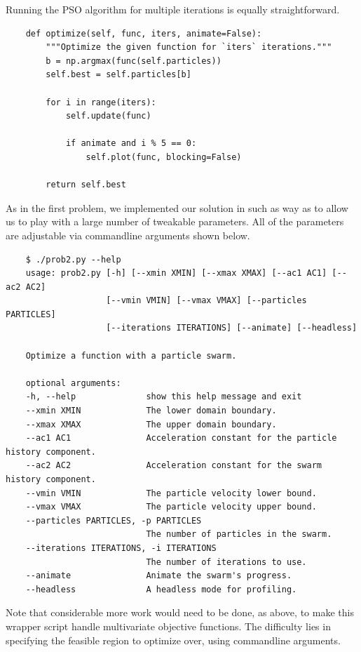 \documentclass[12pt]{article}
\begin{document}
Running the PSO algorithm for multiple iterations is equally straightforward.

\begin{verbatim}
    def optimize(self, func, iters, animate=False):
        """Optimize the given function for `iters` iterations."""
        b = np.argmax(func(self.particles))
        self.best = self.particles[b]

        for i in range(iters):
            self.update(func)

            if animate and i % 5 == 0:
                self.plot(func, blocking=False)

        return self.best
\end{verbatim}

As in the first problem, we implemented our solution in such as way as to allow us to play with a large number of tweakable parameters.
All of the parameters are adjustable via commandline arguments shown below.

\begin{verbatim}
    $ ./prob2.py --help
    usage: prob2.py [-h] [--xmin XMIN] [--xmax XMAX] [--ac1 AC1] [--ac2 AC2]
                    [--vmin VMIN] [--vmax VMAX] [--particles PARTICLES]
                    [--iterations ITERATIONS] [--animate] [--headless]

    Optimize a function with a particle swarm.

    optional arguments:
    -h, --help              show this help message and exit
    --xmin XMIN             The lower domain boundary.
    --xmax XMAX             The upper domain boundary.
    --ac1 AC1               Acceleration constant for the particle history component.
    --ac2 AC2               Acceleration constant for the swarm history component.
    --vmin VMIN             The particle velocity lower bound.
    --vmax VMAX             The particle velocity upper bound.
    --particles PARTICLES, -p PARTICLES
                            The number of particles in the swarm.
    --iterations ITERATIONS, -i ITERATIONS
                            The number of iterations to use.
    --animate               Animate the swarm's progress.
    --headless              A headless mode for profiling.
\end{verbatim}

Note that considerable more work would need to be done, as above, to make this wrapper script handle multivariate objective functions.
The difficulty lies in specifying the feasible region to optimize over, using commandline arguments.
\end{document}
